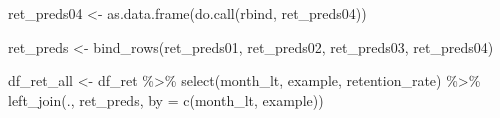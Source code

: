 \documentclass[
]{book}
\newenvironment{Shaded}{\begin{snugshade}}{\end{snugshade}}
\newcommand{\AttributeTok}[1]{\textcolor[rgb]{0.77,0.63,0.00}{#1}}
\newcommand{\FunctionTok}[1]{\textcolor[rgb]{0.00,0.00,0.00}{#1}}
\newcommand{\NormalTok}[1]{#1}
\newcommand{\OtherTok}[1]{\textcolor[rgb]{0.56,0.35,0.01}{#1}}
\newcommand{\SpecialCharTok}[1]{\textcolor[rgb]{0.00,0.00,0.00}{#1}}
\newcommand{\StringTok}[1]{\textcolor[rgb]{0.31,0.60,0.02}{#1}}
\begin{document}
\begin{Shaded}
\begin{Highlighting}[]
\NormalTok{ret\_preds04 }\OtherTok{\textless{}{-}} \FunctionTok{as.data.frame}\NormalTok{(}\FunctionTok{do.call}\NormalTok{(}\StringTok{\textquotesingle{}rbind\textquotesingle{}}\NormalTok{, ret\_preds04))}
 
 
\NormalTok{ret\_preds }\OtherTok{\textless{}{-}} \FunctionTok{bind\_rows}\NormalTok{(ret\_preds01, ret\_preds02, ret\_preds03, ret\_preds04)}
 
 
 
 
\NormalTok{df\_ret\_all }\OtherTok{\textless{}{-}}\NormalTok{ df\_ret }\SpecialCharTok{\%\textgreater{}\%}
        \FunctionTok{select}\NormalTok{(month\_lt, example, retention\_rate) }\SpecialCharTok{\%\textgreater{}\%}
        \FunctionTok{left\_join}\NormalTok{(., ret\_preds, }\AttributeTok{by =} \FunctionTok{c}\NormalTok{(}\StringTok{\textquotesingle{}month\_lt\textquotesingle{}}\NormalTok{, }\StringTok{\textquotesingle{}example\textquotesingle{}}\NormalTok{))}
 

\end{Highlighting}
\end{Shaded}
\end{document}
